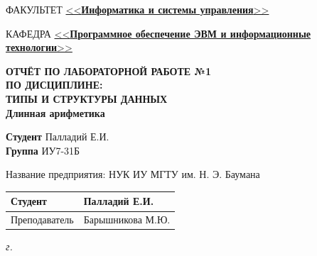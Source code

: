 \begin{titlepage}
	\begin{flushleft}
		\fontsize{12pt}{0.8\baselineskip}\selectfont 
		
		ФАКУЛЬТЕТ \uline{<<\textbf{Информатика и системы управления}>> \hfill}
		
		КАФЕДРА \uline{\mbox{\hspace{4mm}} <<\textbf{Программное обеспечение ЭВМ и информационные технологии}>> \hfill}
	\end{flushleft}
	
	\vspace{1mm}
	
	\begin{center}
		\setstretch{1.2}
		{
			\fontsize{20pt}{\baselineskip}\selectfont\bfseries
			ОТЧЁТ ПО ЛАБОРАТОРНОЙ РАБОТЕ №1 \\
			ПО ДИСЦИПЛИНЕ: \\
			ТИПЫ И СТРУКТУРЫ ДАННЫХ\\
		}
		\vspace{5mm}
		{
			\Large \bfseries
			Длинная арифметика\\
		}
	\end{center}
	
	\vspace{1mm}
	
	\begin{flushleft}
		\textbf{Студент} \uline{\hspace{5cm}} Палладий Е.И. \\
		\vspace{5mm}
		\textbf{Группа} \uline{\hspace{5cm}} ИУ7-31Б \\
	\end{flushleft}
	
	\vspace{40mm}
	
	\begin{flushleft}
		Название предприятия: НУК ИУ МГТУ им. Н. Э. Баумана \\
	\end{flushleft}
	
	
	\begin{flushleft}
		\begin{tabular}{|p{}|p{0.45\textwidth}|}
			\hline
			Студент & \uline{\hspace{3cm}} Палладий Е.И. \\
			\hline
			Преподаватель & \uline{\hspace{3cm}} Барышникова М.Ю. \\
			\hline
		\end{tabular}
	\end{flushleft}
	
	
	\centering\textit{{\the\year} г.}
\end{titlepage}